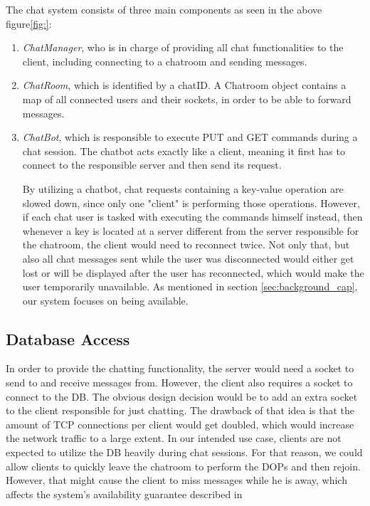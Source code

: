 The chat system consists of three main components as seen in the above figure\ref{fig:}:
\begin{enumerate}
	\item \textit{ChatManager}, who is in charge of providing all chat functionalities to the client, including connecting to a chatroom and sending messages.
	\item \textit{ChatRoom}, which is identified by a chatID. A Chatroom object contains a map of all connected users and their sockets, in order to be able to forward messages.
	\item \textit{ChatBot}, which is responsible to execute PUT and GET commands during a chat session. The chatbot acts exactly like a client, meaning it first has to connect to the responsible server and then send its request.
	
By utilizing a chatbot, chat requests containing a key-value operation are slowed down, since only one "client" is performing those operations. However, if each chat user is tasked with executing the commands himself instead, then whenever a key is located at a server different from the server responsible for the chatroom, the client would need to reconnect twice. Not only that, but also all chat messages sent while the user was disconnected would either get lost or will be displayed after the user has reconnected, which would make the user temporarily unavailable. As mentioned in section \ref{sec:background_cap}, our system focuses on being available. 	

\end{enumerate}

\subsection{Database Access}
\label{sec:groupchat_chatbot}
In order to provide the chatting functionality, the server would need a socket to send to and receive messages from. However, the client also requires a socket to connect to the DB. The obvious design decision would be to add an extra socket to the client responsible for just chatting. The drawback of that idea is that the amount of TCP connections per client would get doubled, which would increase the network traffic to a large extent. In our intended use case, clients are not expected to utilize the DB heavily during chat sessions. For that reason, we could allow clients to quickly leave the chatroom to perform the DOPs and then rejoin. However, that might cause the client to miss messages while he is away, which affects the system's availability guarantee described in %

